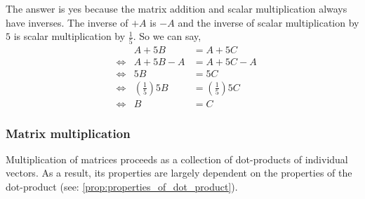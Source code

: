 \documentclass[MathsNotesBase.tex]{subfiles}
\begin{document}
{		
		The answer is yes because the matrix addition and scalar multiplication always have inverses. The inverse of $+ A$ is $- A$ and the inverse of scalar multiplication by $5$ is scalar multiplication by $\frac{1}{5}$. So we can say,
		\begin{align*}
		&& A + 5B &= A + 5C\\[8pt]
		&\iff & A + 5B - A &= A + 5C - A\\[8pt]
		&\iff & 5B &= 5C\\[8pt]
		&\iff & \left(\frac{1}{5}\right)5B &= \left(\frac{1}{5}\right)5C\\[8pt]
		&\iff & B &= C
		\end{align*}
		
		
		
		\subsubsection{Matrix multiplication}\label{sssection:matrix_multiplication}
		Multiplication of matrices proceeds as a collection of dot-products of individual vectors. As a result, its properties are largely dependent on the properties of the dot-product (see: \ref{prop:properties_of_dot_product}).\\
			
}
\end{document}
